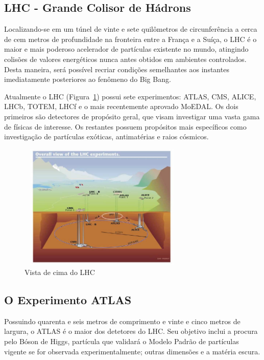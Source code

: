 \documentclass[a4paper,10pt,titlepage]{article}
\begin{document}
\subsection{LHC - Grande Colisor de Hádrons}

Localizando-se em um túnel de vinte e sete quilômetros de circunferência a cerca de cem metros de profundidade na fronteira entre a França e a Suíça, o LHC é o maior e mais poderoso acelerador de partículas existente no mundo, atingindo colisões de valores energéticos nunca antes obtidos em ambientes controlados.
Desta maneira, será possível recriar condições semelhantes aos instantes imediatamente posteriores ao fenômeno do Big Bang.

Atualmente o LHC (Figura~\ref{fig:top_view_lhc}) possui sete experimentos: ATLAS, CMS, ALICE, LHCb, TOTEM, LHCf e o mais recentemente aprovado MoEDAL.
Os dois primeiros são detectores de propósito geral, que visam investigar uma vasta gama de físicas de interesse. Os restantes possuem propósitos mais específicos como investigação de partículas exóticas, antimatérias e raios cósmicos.

\begin{figure}[htbp!]
 \centering
 \includegraphics[width=8cm,height=6cm]{Figs/atlas/top_view_lhc.pdf}
 \caption{Vista de cima do LHC}
 \label{fig:top_view_lhc}
\end{figure}

\subsection{O Experimento ATLAS}

Possuindo quarenta e seis metros de comprimento e vinte e cinco metros de largura, o ATLAS é o maior dos detetores do LHC. Seu objetivo inclui a procura pelo Bóson de Higgs, partícula que validará o Modelo Padrão de partículas vigente se for observada experimentalmente; outras dimensões e a matéria escura.
\end{document}
